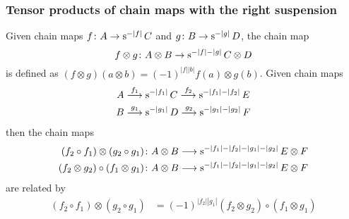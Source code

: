 \subsubsection{Tensor products of chain maps with the right suspension} Given chain maps $f\colon A\to \operatorname{s}^{-|f|}C$ and $g\colon B\to \operatorname{s}^{-|g|}D$, the chain map 
\[
	f\otimes g\colon A\otimes B\to \operatorname{s}^{-|f|-|g|}C\otimes D
\]
is defined as $(f\otimes g)(a\otimes b) = (-1)^{|f||b|} f(a)\otimes g(b)$. Given chain maps 
\begin{align*}
	A & \overset{f_1}{\longrightarrow} \operatorname{s}^{-|f_1|} C \overset{f_2}{\longrightarrow} \operatorname{s}^{-|f_1|-|f_2|} E \\
	B & \overset{g_1}{\longrightarrow} \operatorname{s}^{-|g_1|} D \overset{g_2}{\longrightarrow} \operatorname{s}^{-|g_1|-|g_2|} F \\
\end{align*}
then the chain maps 
\begin{align*}
(f_2\circ f_1)\otimes (g_2\circ g_1)\colon &A\otimes B\longrightarrow \operatorname{s}^{-|f_1|-|f_2|-|g_1|-|g_2|}E\otimes F
\\
(f_2\otimes g_2)\circ (f_1\otimes g_1)\colon &A\otimes B\longrightarrow \operatorname{s}^{-|f_1|-|f_2|-|g_1|-|g_2|}E\otimes F
\end{align*}
 are related by
\begin{align*}
	(f_2\circ f_1)\otimes (g_2\circ g_1) &= (-1)^{|f_2||g_1|}(f_2\otimes g_2)\circ (f_1\otimes g_1)
\end{align*}

